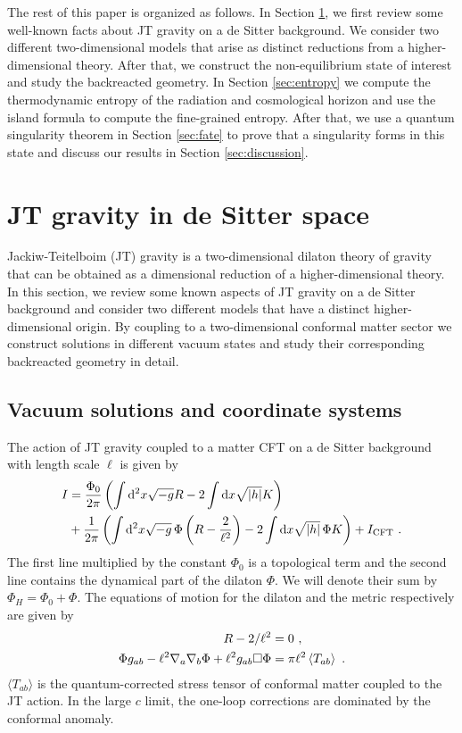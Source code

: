 \documentclass[a4paper,11pt]{article}
\newcommand{\beq}{\begin{equation}}
\newcommand{\eeq}{\end{equation}}
\newcommand{\bal}{\begin{aligned}}
\newcommand{\eal}{\end{aligned}}
\newcommand{\rmd}{\mathrm{d}}
\numberwithin{equation}{section}
\begin{document}
The rest of this paper is organized as follows. In Section \ref{sec:JTgravity}, we first review some well-known facts about JT gravity on a de Sitter background. We consider two different two-dimensional models that arise as distinct reductions from a higher-dimensional theory. After that, we construct the non-equilibrium state of interest and study the backreacted geometry. In Section \ref{sec:entropy} we compute the thermodynamic entropy of the radiation and cosmological horizon and use the island formula to compute the fine-grained entropy. After that, we use a quantum singularity theorem in Section \ref{sec:fate} to prove that a singularity forms in this state and discuss our results in Section \ref{sec:discussion}.


\section{JT gravity in de Sitter space} \label{sec:JTgravity}
%
Jackiw-Teitelboim (JT) gravity is a two-dimensional dilaton theory of gravity that can be obtained as a dimensional reduction of a higher-dimensional theory. In this section, we review some known aspects of JT gravity on a de Sitter background and consider two different models that have a distinct higher-dimensional origin. By coupling to a two-dimensional conformal matter sector we construct solutions in different vacuum states and study their corresponding backreacted geometry in detail.


\subsection{Vacuum solutions and coordinate systems}
%
The action of JT gravity coupled to a matter CFT on a de Sitter background with length scale $\ell$ is given by \cite{JACKIW1985343,TEITELBOIM198341}
\beq \label{eq:JTaction}
\bal
I &= \frac{\Phi_0}{2\pi}\left(\int \rmd^2x\sqrt{-g}R - 2\int\rmd x\sqrt{|h|} K\right) \\
&+\frac1{2\pi}\left(\int \rmd^2x\sqrt{-g}\,\Phi\left(R-\frac2{\ell^2}\right) - 2\int\rmd x\sqrt{|h|}\,\Phi K \right) + I_{\rm CFT}~.
\eal
\eeq
The first line multiplied by the constant $\Phi_0$ is a topological term and the second line contains the dynamical part of the dilaton $\Phi$. We will denote their sum by $\Phi_H = \Phi_0 + \Phi$. The equations of motion for the dilaton and the metric respectively are given by
\beq
\bal \label{eq:EOM}
R-2/\ell^2 &=0 ~, \\
\Phi g_{ab} - \ell^2 \nabla_a\nabla_b\Phi + \ell^2 g_{ab}\square \Phi &= \pi \ell^2\braket{T_{ab}} ~.
\eal
\eeq
$\langle T_{ab}\rangle$ is the quantum-corrected stress tensor of conformal matter coupled to the JT action. In the large $c$ limit, the one-loop corrections are dominated by the conformal anomaly.
\end{document}

